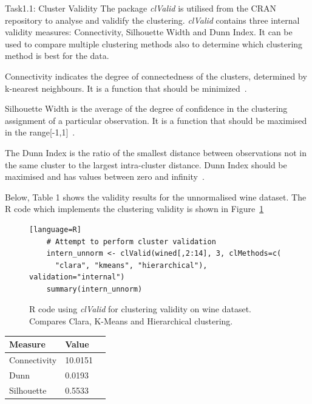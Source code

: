 \documentclass[11pt]{article}
\begin{document}
\pagebreak\FloatBarrier\begin{subsection}{Task1.1: Cluster Validity}
    The package \textit{clValid}\cite{brock2011clvalid} is utilised from the CRAN repository to analyse and validify the clustering. \textit{clValid} contains three internal validity measures: Connectivity, Silhouette Width and Dunn Index. It can be used to compare multiple clustering methods also to determine which clustering method is best for the data.

    Connectivity indicates the degree of connectedness of the clusters, determined by k-nearest neighbours. It is a function that should be minimized~\cite{brock2011clvalid}.
    
    Silhouette Width is the average of the degree of confidence in the clustering assignment of a particular observation. It is a function that should be maximised in the range[-1,1]~\cite{brock2011clvalid}.
    
    The Dunn Index is the ratio of the smallest distance between observations not in the same cluster to the largest intra-cluster distance. Dunn Index should be maximised and has values between zero and infinity~\cite{brock2011clvalid}.
    
Below, Table 1 shows the validity results for the unnormalised wine dataset. The R code which implements the clustering validity is shown in Figure~\ref{fig:clustering_valid_r}

    \begin{figure}[H]
	\begin{lstlisting}[basicstyle=\ttfamily][language=R]
	# Attempt to perform cluster validation
	intern_unnorm <- clValid(wined[,2:14], 3, clMethods=c(
	  "clara", "kmeans", "hierarchical"), validation="internal")
	summary(intern_unnorm)
	\end{lstlisting}
	\caption{R code using \textit{clValid} for clustering validity on wine dataset. Compares Clara, K-Means and Hierarchical clustering.}
	\label{fig:clustering_valid_r}
    \end{figure}

 \begin{center}   
     \begin{tabular}{@{}llr@{}}
	\toprule[1.5pt]
	Measure & Value \\
	\toprule[1.5pt]
	Connectivity & 10.0151 \\ \midrule
	Dunn & 0.0193 \\ \midrule
	Silhouette & 0.5533 \\
	\bottomrule[1.25pt]
    \end{tabular}

\end{center}
\end{subsection}
\end{document}
